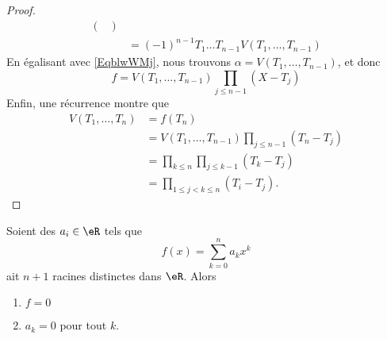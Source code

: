 \begin{proof}
\begin{subequations}
\begin{align}
\begin{pmatrix}
			                                       \end{pmatrix} \\
			     & =(-1)^{n-1}T_1\ldots T_{n-1}V(T_1,\ldots, T_{n-1})
		\end{align}
	\end{subequations}
	En égalisant avec \eqref{EqblwWMj}, nous trouvons \( \alpha=V(T_1,\ldots, T_{n-1})\), et donc
	\begin{equation}
		f=V(T_1,\ldots, T_{n-1})\prod_{j\leq n-1}(X-T_j)
	\end{equation}
	Enfin, une récurrence montre que
	\begin{subequations}
		\begin{align}
			V(T_1,\ldots, T_n) & =f(T_n)                                           \\
			                   & =V(T_1,\ldots, T_{n-1})\prod_{j\leq n-1}(T_n-T_j) \\
			                   & =\prod_{k\leq n}\prod_{j\leq k-1}(T_k-T_j)        \\
			                   & =\prod_{1\leq j<k\leq n}(T_i-T_j).
		\end{align}
	\end{subequations}
\end{proof}

\begin{proposition}	\label{PROPooNVXIooXJKplZ}
	Soient des \( a_i\in \eR\) tels que
	\begin{equation}
		f(x)=\sum_{k=0}^na_kx^k
	\end{equation}
	ait \( n+1\) racines distinctes dans \( \eR\). Alors
	\begin{enumerate}
		\item
		      \( f=0\)
		\item
		      \( a_k=0\) pour tout \( k\).
	\end{enumerate}
\end{proposition}

